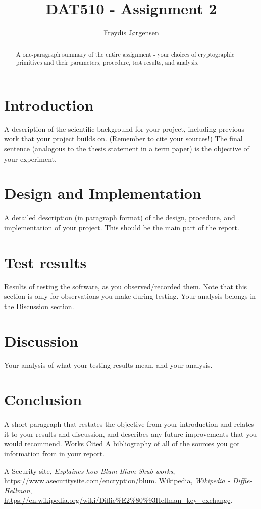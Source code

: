 \documentclass[12pt, letterpaper]{article}
\title{DAT510 - Assignment 2}
\author{Fr\o ydis J\o rgensen}
\begin{document}
\begin{titlepage}
\maketitle
\end{titlepage}

\begin{abstract}
A one-paragraph summary of the entire assignment - your choices of cryptographic primitives and their parameters,
procedure, test results, and analysis. 
\end{abstract}

\section*{Introduction}
A description of the scientific background for your project, including previous work that your project builds on.
(Remember to cite your sources!) The final sentence (analogous to the thesis statement in a term paper) is the
objective of your experiment. 

\section*{Design and Implementation}
A detailed description (in paragraph format) of the design, procedure, and implementation of your project. This
should be the main part of the report. 

\section*{Test results}
Results of testing the software, as you observed/recorded them. Note that this section is only for observations you
make during testing. Your analysis belongs in the Discussion section. 

\section*{Discussion}
Your analysis of what your testing results mean, and your analysis.

\section*{Conclusion}
A short paragraph that restates the objective from your introduction and relates it to your results and discussion, and
describes any future improvements that you would recommend. Works Cited A bibliography of all of the sources
you got information from in your report. 


\begin{thebibliography}{10} 
 A Security site,  \emph{Explaines how Blum Blum Shub works},
\url{https://www.asecuritysite.com/encryption/blum}.
 Wikipedia,  \emph{Wikipedia - Diffie-Hellman},
\url{https://en.wikipedia.org/wiki/Diffie%E2%80%93Hellman_key_exchange}.
\end{thebibliography}
\end{document}
